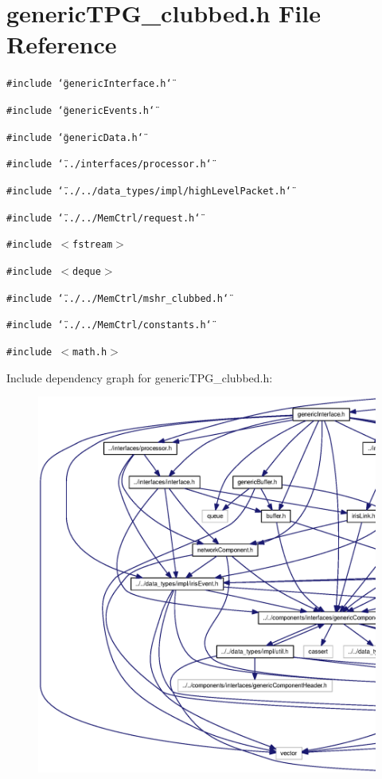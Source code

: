 \section{genericTPG\_\-clubbed.h File Reference}
\label{genericTPG__clubbed_8h}
{\tt \#include \char`\"{}genericInterface.h\char`\"{}}\par
{\tt \#include \char`\"{}genericEvents.h\char`\"{}}\par
{\tt \#include \char`\"{}genericData.h\char`\"{}}\par
{\tt \#include \char`\"{}../interfaces/processor.h\char`\"{}}\par
{\tt \#include \char`\"{}../../data\_\-types/impl/highLevelPacket.h\char`\"{}}\par
{\tt \#include \char`\"{}../../MemCtrl/request.h\char`\"{}}\par
{\tt \#include $<$fstream$>$}\par
{\tt \#include $<$deque$>$}\par
{\tt \#include \char`\"{}../../MemCtrl/mshr\_\-clubbed.h\char`\"{}}\par
{\tt \#include \char`\"{}../../MemCtrl/constants.h\char`\"{}}\par
{\tt \#include $<$math.h$>$}\par


Include dependency graph for genericTPG\_\-clubbed.h:\nopagebreak
\begin{figure}[H]
\begin{center}
\leavevmode
\includegraphics[width=420pt]{genericTPG__clubbed_8h__incl}
\end{center}
\end{figure}



